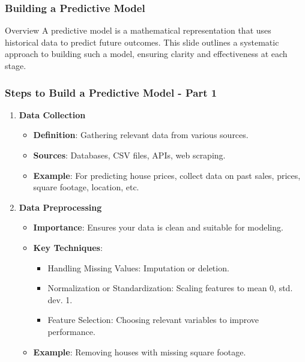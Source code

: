 \documentclass{beamer}
\begin{document}
\begin{frame}
    \frametitle{Building a Predictive Model}
    \begin{block}{Overview}
        A predictive model is a mathematical representation that uses historical data to predict future outcomes.
        This slide outlines a systematic approach to building such a model, ensuring clarity and effectiveness at each stage.
    \end{block}
\end{frame}

\begin{frame}
    \frametitle{Steps to Build a Predictive Model - Part 1}
    \begin{enumerate}
        \item \textbf{Data Collection}
            \begin{itemize}
                \item \textbf{Definition}: Gathering relevant data from various sources.
                \item \textbf{Sources}: Databases, CSV files, APIs, web scraping.
                \item \textbf{Example}: For predicting house prices, collect data on past sales, prices, square footage, location, etc.
            \end{itemize}

        \item \textbf{Data Preprocessing}
            \begin{itemize}
                \item \textbf{Importance}: Ensures your data is clean and suitable for modeling.
                \item \textbf{Key Techniques}:
                    \begin{itemize}
                        \item Handling Missing Values: Imputation or deletion.
                        \item Normalization or Standardization: Scaling features to mean 0, std. dev. 1.
                        \item Feature Selection: Choosing relevant variables to improve performance.
                    \end{itemize}
                \item \textbf{Example}: Removing houses with missing square footage.
            \end{itemize}
    \end{enumerate}
\end{frame}
\end{document}
